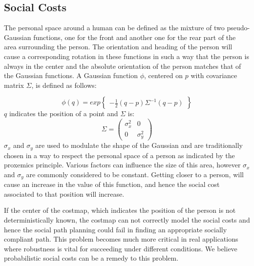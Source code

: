 
\subsection{Social Costs}


The personal space around a human can be defined as the mixture of two pseudo-Gaussian functions, one for the front and another one for the rear part of the area surrounding the person. The orientation and heading of the person will cause a corresponding rotation in these functions in such a way that the person is always in the center and the absolute orientation of the person matches that of the Gaussian functions. 
A Gaussian function $\phi$, centered on $p$ with covariance matrix $\Sigma$, is defined as follows:

\begin{equation}
\phi(q) = exp\begin{Bmatrix}
-\frac{1}{2}(q-p)\Sigma^{-1}(q-p)
\end{Bmatrix}\end{equation}
$q$ indicates the position of a point and $\Sigma$ is:
\begin{equation}
\Sigma = \begin{pmatrix}
{\sigma}_{x}^2  & 0\\ 
 0& {\sigma}_{y}^2 
\end{pmatrix}
\end{equation}
${\sigma}_{x}$ and ${\sigma}_{y}$ are used to modulate the shape of the Gaussian and are traditionally chosen in a way to respect the personal space of a person as indicated by the proxemics principle. Various factors can influence the size of this area, however ${\sigma}_{x}$ and ${\sigma}_{y}$ are commonly considered to be constant. Getting closer to a person, will cause an increase in the value of this function, and hence the social cost associated to that position will increase.

If the center of the costmap, which indicates the position of the person is not deterministically known, the costmap can not correctly model the social costs and hence the social path planning could fail in finding an appropriate socially compliant path. This problem becomes much more critical in real applications where robustness is vital for succeeding under different conditions. We believe probabilistic social costs can be a remedy to this problem. 


